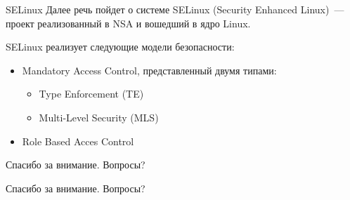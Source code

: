 \documentclass{beamer}
\begin{document}
\begin{frame}{SELinux}
Далее речь пойдет о системе 
SELinux (Security Enhanced Linux)~--- проект реализованный в
NSA и вошедший в ядро Linux.

\begin{block}{SELinux реализует следующие модели безопасности:}

\begin{itemize}
\item Mandatory Access Control, представленный двумя типами:
    \begin{itemize}
    \item Type Enforcement (TE)
    \item Multi-Level Security (MLS)
    \end{itemize}
\item Role Based Acces Control
\end{itemize}

\end{block}

\end{frame}

\begin{frame}{Спасибо за внимание. Вопросы?}
\begin{center}
\LARGE{Спасибо за внимание. Вопросы?}
\end{center}

   
\end{frame}
\end{document}
